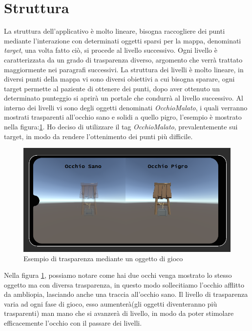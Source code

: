 \documentclass[
a4paper,
cleardoublepage=empty,
headings=twolinechapter,
numbers=autoenddot,
]{scrbook}
\begin{document}
    \section{Struttura}
    La struttura dell'applicativo è molto lineare, bisogna raccogliere dei punti mediante l'interazione con determinati oggetti sparsi per la mappa, denominati \textit{target}, una volta fatto ciò, si procede al livello successivo.
    Ogni livello è caratterizzata da un grado di trasparenza diverso, argomento che verrà trattato maggiormente nei paragrafi successivi.
    La struttura dei livelli è molto lineare, in diversi punti della mappa vi sono diversi obiettivi a cui bisogna sparare, ogni target permette al paziente di ottenere dei punti, dopo aver ottenuto un determinato punteggio si aprirà un portale che condurrà al livello successivo.
    Al interno dei livelli vi sono degli oggetti denominati \textit{OcchioMalato}, i quali verranno mostrati trasparenti all'occhio sano e solidi a quello pigro, l'esempio è mostrato nella figura:\ref{fig:pozzo}.
    Ho deciso di utilizzare il tag \textit{OcchioMalato}, prevalentemente sui target, in modo da rendere l'ottenimento dei punti più difficile. 
    \begin{figure}[H]
    	\centering
    	\includegraphics[width=0.8\linewidth]{image/Pr_trasparenza}
    	\caption{Esempio di trasparenza mediante un oggetto di gioco}
    	\label{fig:pozzo}
    \end{figure}
    Nella figura \ref{fig:pozzo}, possiamo notare come hai due occhi venga mostrato lo stesso oggetto ma con diversa trasparenza, in questo modo sollecitiamo l'occhio afflitto da ambliopia, lasciando anche una traccia all'occhio sano.
    Il livello di trasparenza varia ad ogni fase di gioco, esso aumenterà(gli oggetti diventeranno più trasparenti) man mano che si avanzerà di livello, in modo da poter stimolare efficacemente l'occhio con il passare dei livelli.
\end{document}
